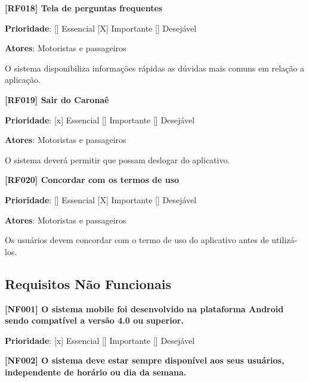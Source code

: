 \textbf{[RF018]  Tela de perguntas frequentes}

\textbf{Prioridade}:      [] Essencial        [X] Importante     [] Desejável 

\textbf{Atores}: Motoristas e passageiros

O sistema disponibiliza informações rápidas as dúvidas mais comuns em relação a aplicação.

\textbf{[RF019] Sair do Caronaê}

\textbf{Prioridade}:      [x] Essencial        [] Importante     [] Desejável 

\textbf{Atores}: Motoristas e passageiros

O sistema deverá permitir que possam deslogar do aplicativo.

\textbf{[RF020] Concordar com os termos de uso} 

\textbf{Prioridade}:      [] Essencial        [X] Importante     [] Desejável 

\textbf{Atores}: Motoristas e passageiros

Os usuários devem concordar com o termo de uso do aplicativo antes de utilizá-los.


\subsection{Requisitos Não Funcionais}

\textbf{[NF001] O sistema mobile foi desenvolvido na plataforma Android sendo compatível a versão 4.0 ou superior. %
}

\textbf{Prioridade}:      [x] Essencial        [] Importante     [] Desejável 



\textbf{[NF002] O sistema deve estar sempre disponível  aos seus usuários, independente de horário ou dia da semana. %
}

